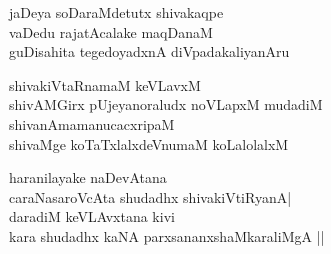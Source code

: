 
\begin{entry}
\end{entry}

\begin{entry}
\end{entry}

\begin{entry}
\gl{}
\begin{shl}
jaDeya soDaraMdetutx shivakaqpe\\
vaDedu rajatAcalake maqDanaM\\
guDisahita tegedoyadxnA diVpadakaliyanAru
\end{shl}
\end{entry}

\begin{entry}
\gl{}
\begin{shl}
shivakiVtaRnamaM keVLavxM\\
shivAMGirx pUjeyanoraludx noVLapxM mudadiM\\
shivanAmamanucacxripaM\\
shivaMge koTaTxlalxdeVnumaM koLalolalxM
\end{shl}
\end{entry}

\begin{entry}
\gl{}
\begin{shl}
haranilayake naDevAtana\\
caraNasaroVcAta shudadhx shivakiVtiRyanA|\\
daradiM keVLAvxtana kivi\\
kara shudadhx kaNA parxsananxshaMkaraliMgA ||
\end{shl}
\end{entry}

